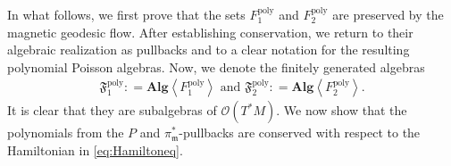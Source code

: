 \documentclass[11pt]{amsart}
\theoremstyle{definition}
\theoremstyle{plain}
\theoremstyle{conclusion}
\begin{document}
 In what follows, we first prove that the sets $F_1^{\mathrm{poly}}$ and $F_2^\mathrm{poly}$ are preserved by the magnetic geodesic flow. After establishing conservation, we return to their algebraic realization as pullbacks and to a clear notation for the resulting polynomial Poisson algebras.  Now, we denote the finitely generated algebras  \begin{align*}
    \mathfrak{F}_1^{\mathrm{poly}} : = \textbf{Alg} \left\langle F_1^{\mathrm{poly}}\right\rangle \text{ and }   \mathfrak{F}_2^{\mathrm{poly}} : = \textbf{Alg} \left\langle F_2^{\mathrm{poly}}\right\rangle .
\end{align*} %
It is clear that they are subalgebras of $\mathcal{O}(T^*M)$. %
We now show that the polynomials from the $P$ and $\pi_{\mathfrak{m}}^*$-pullbacks are conserved with respect to the Hamiltonian in \eqref{eq:Hamiltoneq}.%
\end{document}
